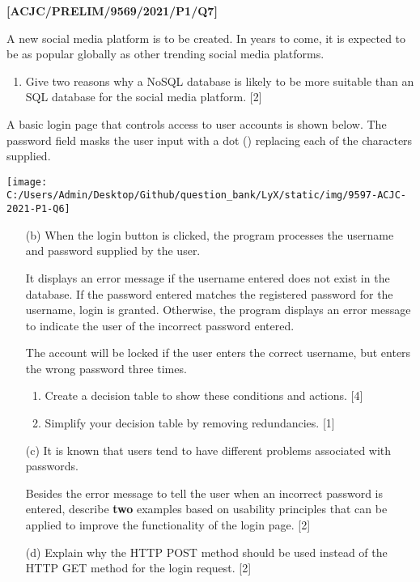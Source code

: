 \item \textbf{{[}ACJC/PRELIM/9569/2021/P1/Q7{]} }

A new social media platform is to be created. In years to come, it
is expected to be as popular globally as other trending social media
platforms.
\begin{enumerate}
\item Give two reasons why a NoSQL database is likely to be more suitable
than an SQL database for the social media platform. \hfill{}{[}2{]}
\end{enumerate}
A basic login page that controls access to user accounts is shown
below. The password field masks the user input with a dot (\textbullet )
replacing each of the characters supplied.
\noindent \begin{center}
\texttt{[image: C:/Users/Admin/Desktop/Github/question\_bank/LyX/static/img/9597-ACJC-2021-P1-Q6]}\quad{}
\par\end{center}
\begin{enumerate}
\item[(b)] When the login button is clicked, the program processes the username
and password supplied by the user.

It displays an error message if the username entered does not exist
in the database. If the password entered matches the registered password
for the username, login is granted. Otherwise, the program displays
an error message to indicate the user of the incorrect password entered.

The account will be locked if the user enters the correct username,
but enters the wrong password three times.
\begin{enumerate}
\item Create a decision table to show these conditions and actions. \hfill{}{[}4{]} 
\item Simplify your decision table by removing redundancies. \hfill{}{[}1{]} 
\end{enumerate}
\item[(c)] It is known that users tend to have different problems associated
with passwords.

Besides the error message to tell the user when an incorrect password
is entered, describe \textbf{two} examples based on usability principles
that can be applied to improve the functionality of the login page.
{[}2{]}
\item[(d)] Explain why the HTTP POST method should be used instead of the HTTP
GET method for the login request. \hfill{}{[}2{]}
\end{enumerate}